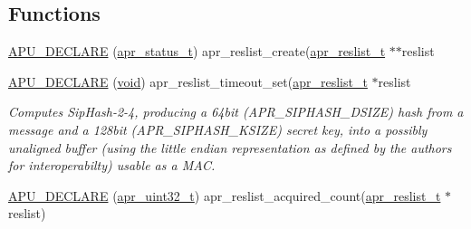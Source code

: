 \subsection*{Functions}
\begin{DoxyCompactItemize}
\item 
\hyperlink{group__APR__Util__RL_ga0f5e679d50a07fbcd4a4120617629354}{A\+P\+U\+\_\+\+D\+E\+C\+L\+A\+RE} (\hyperlink{group__apr__errno_gaa5105fa83cc322f09382292db8b47593}{apr\+\_\+status\+\_\+t}) apr\+\_\+reslist\+\_\+create(\hyperlink{structapr__reslist__t}{apr\+\_\+reslist\+\_\+t} $\ast$$\ast$reslist
\item 
\hyperlink{group__APR__Util__RL_ga769b2ae6e26d584763aac4c648151d2e}{A\+P\+U\+\_\+\+D\+E\+C\+L\+A\+RE} (\hyperlink{group__MOD__ISAPI_gacd6cdbf73df3d9eed42fa493d9b621a6}{void}) apr\+\_\+reslist\+\_\+timeout\+\_\+set(\hyperlink{structapr__reslist__t}{apr\+\_\+reslist\+\_\+t} $\ast$reslist
\begin{DoxyCompactList}\small\item\em Computes Sip\+Hash-\/2-\/4, producing a 64bit (A\+P\+R\+\_\+\+S\+I\+P\+H\+A\+S\+H\+\_\+\+D\+S\+I\+ZE) hash from a message and a 128bit (A\+P\+R\+\_\+\+S\+I\+P\+H\+A\+S\+H\+\_\+\+K\+S\+I\+ZE) secret key, into a possibly unaligned buffer (using the little endian representation as defined by the authors for interoperabilty) usable as a M\+AC. \end{DoxyCompactList}\item 
\hyperlink{group__APR__Util__RL_ga81a7e5b310111b6c666aa89b36be6e14}{A\+P\+U\+\_\+\+D\+E\+C\+L\+A\+RE} (\hyperlink{group__apr__platform_ga558548a135d8a816c4787250744ea147}{apr\+\_\+uint32\+\_\+t}) apr\+\_\+reslist\+\_\+acquired\+\_\+count(\hyperlink{structapr__reslist__t}{apr\+\_\+reslist\+\_\+t} $\ast$reslist)
\end{DoxyCompactItemize}
